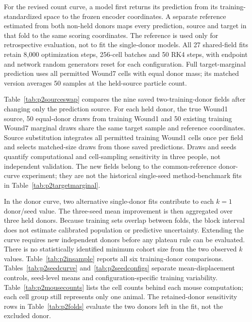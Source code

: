For the revised count curve, a model first returns its prediction from its training-standardized space to the frozen encoder coordinates. A separate reference estimated from both non-held donors maps every prediction, source and target in that fold to the same scoring coordinates. The reference is used only for retrospective evaluation, not to fit the single-donor models. All 27 shared-field fits retain 8,000 optimization steps, 256-cell batches and 50 RK4 steps, with endpoint and network random generators reset for each configuration. Full target-marginal prediction uses all permitted Wound7 cells with equal donor mass; its matched version averages 50 samples at the held-source particle count.

Table~\ref{tab:p2sourceswap} compares the nine saved two-training-donor fields after changing only the prediction source. For each held donor, the true Wound1 source, 50 equal-donor draws from training Wound1 and 50 existing training Wound7 marginal draws share the same target sample and reference coordinates. Source substitution integrates all permitted training Wound1 cells once per field and selects matched-size draws from those saved predictions. Draws and seeds quantify computational and cell-sampling sensitivity in three people, not independent validation. The new fields belong to the common-reference donor-curve experiment; they are not the historical single-seed method-benchmark fits in Table~\ref{tab:p2targetmarginal}.

In the donor curve, two alternative single-donor fits contribute to each $k=1$ donor/seed value. The three-seed mean improvement is then aggregated over three held donors. Because training sets overlap between folds, the block interval does not estimate calibrated population or predictive uncertainty. Extending the curve requires new independent donors before any plateau rule can be evaluated. There is no statistically identified minimum cohort size from the two observed $k$ values.
Table~\ref{tab:p2insample} reports all six training-donor comparisons. Tables~\ref{tab:p2seedcurve} and~\ref{tab:p2seedconfigs} separate mean-displacement controls, seed-level means and configuration-specific training variability. Table~\ref{tab:p2mousecounts} lists the cell counts behind each mouse computation; each cell group still represents only one animal. The retained-donor sensitivity rows in Table~\ref{tab:p2folds} evaluate the two donors left in the fit, not the excluded donor.
{\renewcommand{\arraystretch}{.95}}
